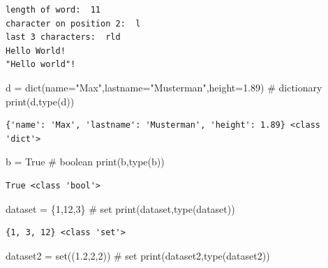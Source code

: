 \documentclass[
  letterpaper,
  DIV=11,
  numbers=noendperiod]{scrreprt}
\newenvironment{Shaded}{\begin{snugshade}}{\end{snugshade}}
\newcommand{\BuiltInTok}[1]{\textcolor[rgb]{0.00,0.23,0.31}{#1}}
\newcommand{\CommentTok}[1]{\textcolor[rgb]{0.37,0.37,0.37}{#1}}
\newcommand{\DecValTok}[1]{\textcolor[rgb]{0.68,0.00,0.00}{#1}}
\newcommand{\FloatTok}[1]{\textcolor[rgb]{0.68,0.00,0.00}{#1}}
\newcommand{\NormalTok}[1]{\textcolor[rgb]{0.00,0.23,0.31}{#1}}
\newcommand{\OperatorTok}[1]{\textcolor[rgb]{0.37,0.37,0.37}{#1}}
\newcommand{\StringTok}[1]{\textcolor[rgb]{0.13,0.47,0.30}{#1}}
\newcommand{\VariableTok}[1]{\textcolor[rgb]{0.07,0.07,0.07}{#1}}
\begin{document}
\begin{verbatim}
length of word:  11
character on position 2:  l
last 3 characters:  rld
Hello World!
"Hello world"!
\end{verbatim}

\begin{Shaded}
\begin{Highlighting}[]
\NormalTok{d }\OperatorTok{=} \BuiltInTok{dict}\NormalTok{(name}\OperatorTok{=}\StringTok{"Max"}\NormalTok{,lastname}\OperatorTok{=}\StringTok{"Musterman"}\NormalTok{,height}\OperatorTok{=}\FloatTok{1.89}\NormalTok{) }\CommentTok{\# dictionary}
\BuiltInTok{print}\NormalTok{(d,}\BuiltInTok{type}\NormalTok{(d))}
\end{Highlighting}
\end{Shaded}

\begin{verbatim}
{'name': 'Max', 'lastname': 'Musterman', 'height': 1.89} <class 'dict'>
\end{verbatim}

\begin{Shaded}
\begin{Highlighting}[]
\NormalTok{b }\OperatorTok{=} \VariableTok{True} \CommentTok{\# boolean}
\BuiltInTok{print}\NormalTok{(b,}\BuiltInTok{type}\NormalTok{(b))}
\end{Highlighting}
\end{Shaded}

\begin{verbatim}
True <class 'bool'>
\end{verbatim}

\begin{Shaded}
\begin{Highlighting}[]
\NormalTok{dataset }\OperatorTok{=}\NormalTok{ \{}\DecValTok{1}\NormalTok{,}\DecValTok{12}\NormalTok{,}\DecValTok{3}\NormalTok{\} }\CommentTok{\# set }
\BuiltInTok{print}\NormalTok{(dataset,}\BuiltInTok{type}\NormalTok{(dataset))}
\end{Highlighting}
\end{Shaded}

\begin{verbatim}
{1, 3, 12} <class 'set'>
\end{verbatim}

\begin{Shaded}
\begin{Highlighting}[]
\NormalTok{dataset2 }\OperatorTok{=} \BuiltInTok{set}\NormalTok{((}\FloatTok{1.2}\NormalTok{,}\DecValTok{2}\NormalTok{,}\DecValTok{2}\NormalTok{)) }\CommentTok{\# set}
\BuiltInTok{print}\NormalTok{(dataset2,}\BuiltInTok{type}\NormalTok{(dataset2))}
\end{Highlighting}
\end{Shaded}
\end{document}
